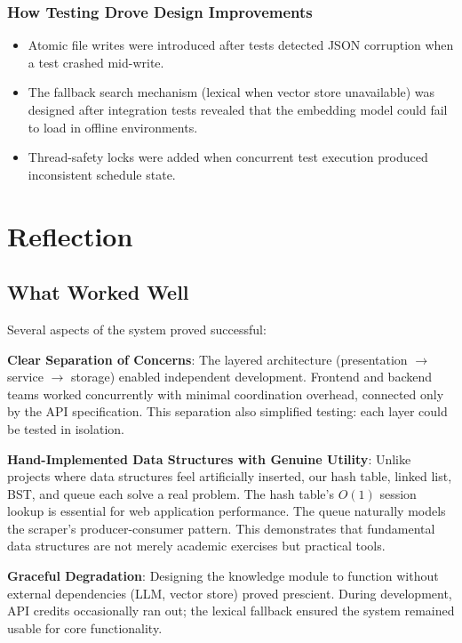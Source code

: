 \documentclass[11pt,a4paper]{article}
\begin{document}
\subsubsection{How Testing Drove Design Improvements}
\begin{itemize}
    \item Atomic file writes were introduced after tests detected JSON corruption when a test crashed mid-write.
    \item The fallback search mechanism (lexical when vector store unavailable) was designed after integration tests revealed that the embedding model could fail to load in offline environments.
    \item Thread-safety locks were added when concurrent test execution produced inconsistent schedule state.
\end{itemize}

\section{Reflection}

\subsection{What Worked Well}
Several aspects of the system proved successful:

\textbf{Clear Separation of Concerns}: The layered architecture (presentation $\rightarrow$ service $\rightarrow$ storage) enabled independent development. Frontend and backend teams worked concurrently with minimal coordination overhead, connected only by the API specification. This separation also simplified testing: each layer could be tested in isolation.

\textbf{Hand-Implemented Data Structures with Genuine Utility}: Unlike projects where data structures feel artificially inserted, our hash table, linked list, BST, and queue each solve a real problem. The hash table's $O(1)$ session lookup is essential for web application performance. The queue naturally models the scraper's producer-consumer pattern. This demonstrates that fundamental data structures are not merely academic exercises but practical tools.

\textbf{Graceful Degradation}: Designing the knowledge module to function without external dependencies (LLM, vector store) proved prescient. During development, API credits occasionally ran out; the lexical fallback ensured the system remained usable for core functionality.
\end{document}
